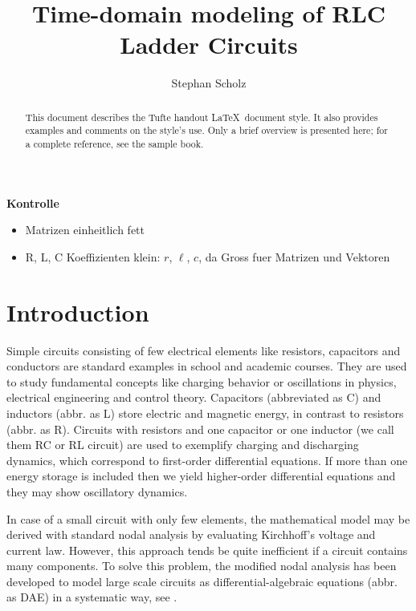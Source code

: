 \documentclass[a4paper, nobib,justified]{tufte-handout}
\title{Time-domain modeling of RLC Ladder Circuits}
\author[Stephan Scholz]{Stephan Scholz}
\begin{document}
	
	
	
	\maketitle%
	
	\begin{abstract}
		\noindent
		This document describes the Tufte handout \LaTeX\ document style.
		It also provides examples and comments on the style's use.
		Only a brief overview is presented here;
		for a complete reference, see the sample book.
	\end{abstract}
	
	{ \color{red}
	\textbf{Kontrolle}
	\begin{itemize}
		\item Matrizen einheitlich fett
		\item R, L, C Koeffizienten klein: $r$, $\ell$, $c$, da Gross fuer Matrizen und Vektoren
	\end{itemize}
	}
	
	\section*{Introduction}
Simple circuits consisting of few electrical elements like resistors, capacitors and conductors are standard examples in school and academic courses. They are used to study fundamental concepts like charging behavior or oscillations in physics, electrical engineering and control theory. Capacitors (abbreviated as C) and inductors (abbr. as L) store electric and magnetic energy, in contrast to resistors (abbr. as R). Circuits with resistors and one capacitor or one inductor (we call them RC or RL circuit) are used to exemplify charging and discharging dynamics, which correspond to first-order differential equations. If more than one energy storage is included then we yield higher-order differential equations and they may show oscillatory dynamics. 

In case of a small circuit with only few elements, the mathematical model may be derived with standard nodal analysis by evaluating Kirchhoff's voltage and current law. However, this approach tends be quite inefficient if a circuit contains many components. To solve this problem, the modified nodal analysis has been developed to model large scale circuits as differential-algebraic equations (abbr. as DAE) in a systematic way, see
\cite[p. 27 ff.]{book:najm2010circuit} \cite{article:tischendorf1998topological,article:marz2003finding}.
\end{document}
